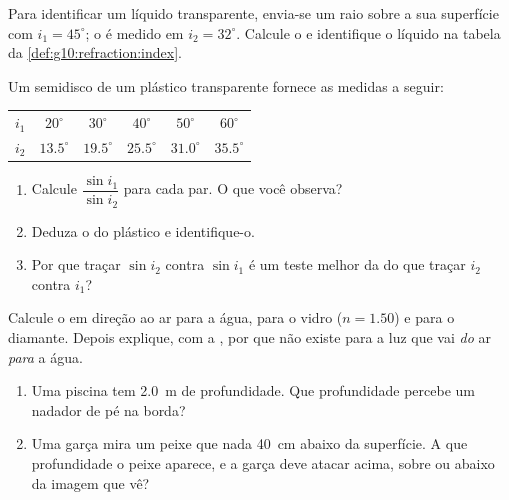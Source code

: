 \begin{exercise}[$\star$]\label{exo:g10:refraction:5}
Para identificar um líquido transparente, envia-se um raio sobre a sua
superfície com $i_1 = 45^\circ$; o  é medido em
$i_2 = 32^\circ$. Calcule o  e identifique o líquido na
tabela da \cref{def:g10:refraction:index}.
\end{exercise}

\begin{exercise}[$\star\star$]\label{exo:g10:refraction:6}
Um semidisco de um plástico transparente fornece as medidas a seguir:
\begin{center}
\begin{tabular}{lccccc}
$i_1$ & $20^\circ$ & $30^\circ$ & $40^\circ$ & $50^\circ$ & $60^\circ$ \\
$i_2$ & $13.5^\circ$ & $19.5^\circ$ & $25.5^\circ$ & $31.0^\circ$
      & $35.5^\circ$ \\
\end{tabular}
\end{center}
\begin{enumerate}
  \item Calcule $\dfrac{\sin i_1}{\sin i_2}$ para cada par. O que você
        observa?
  \item Deduza o  do plástico e identifique-o.
  \item Por que traçar $\sin i_2$ contra $\sin i_1$ é um teste melhor da
         do que traçar $i_2$ contra $i_1$?
\end{enumerate}
\end{exercise}

\begin{exercise}[$\star\star$]\label{exo:g10:refraction:7}
Calcule o  em direção ao ar para a água, para o vidro
($n = 1.50$) e para o diamante. Depois explique, com a , por
que não existe  para a luz que vai \emph{do} ar \emph{para}
a água.
\end{exercise}

\begin{exercise}[$\star\star$]\label{exo:g10:refraction:8}
\begin{enumerate}
  \item Uma piscina tem \qty{2.0}{m} de profundidade. Que profundidade
        percebe um nadador de pé na borda?
  \item Uma garça mira um peixe que nada \qty{40}{cm} abaixo da
        superfície. A que profundidade o peixe aparece, e a garça deve
        atacar acima, sobre ou abaixo da imagem que vê?
\end{enumerate}
\end{exercise}

